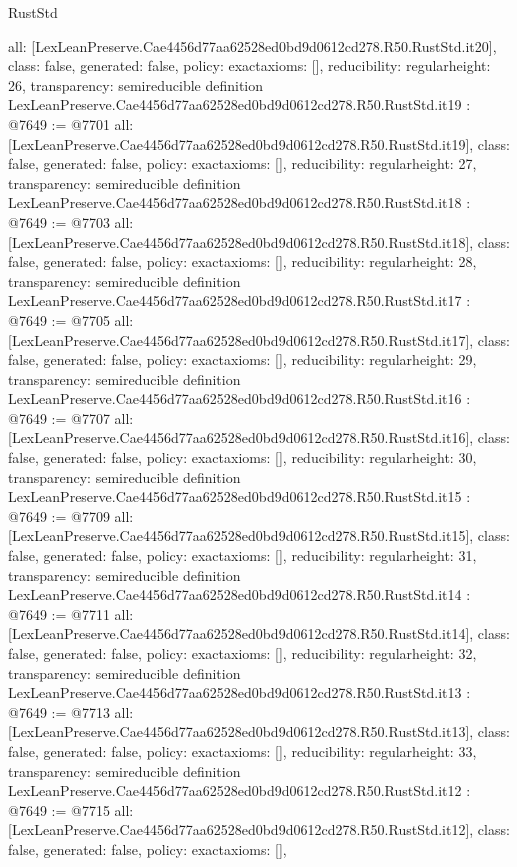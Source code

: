 \begin{lexlean}{RustStd}
\begin{coremodule}
{  all: [LexLeanPreserve.Cae4456d77aa62528ed0bd9d0612cd278.R50.RustStd.it20],
  class: false,
  generated: false,
  policy: exact{axioms: []},
  reducibility: regular{height: 26},
  transparency: semireducible
}
definition LexLeanPreserve.Cae4456d77aa62528ed0bd9d0612cd278.R50.RustStd.it19 : @7649 := @7701 {
  all: [LexLeanPreserve.Cae4456d77aa62528ed0bd9d0612cd278.R50.RustStd.it19],
  class: false,
  generated: false,
  policy: exact{axioms: []},
  reducibility: regular{height: 27},
  transparency: semireducible
}
definition LexLeanPreserve.Cae4456d77aa62528ed0bd9d0612cd278.R50.RustStd.it18 : @7649 := @7703 {
  all: [LexLeanPreserve.Cae4456d77aa62528ed0bd9d0612cd278.R50.RustStd.it18],
  class: false,
  generated: false,
  policy: exact{axioms: []},
  reducibility: regular{height: 28},
  transparency: semireducible
}
definition LexLeanPreserve.Cae4456d77aa62528ed0bd9d0612cd278.R50.RustStd.it17 : @7649 := @7705 {
  all: [LexLeanPreserve.Cae4456d77aa62528ed0bd9d0612cd278.R50.RustStd.it17],
  class: false,
  generated: false,
  policy: exact{axioms: []},
  reducibility: regular{height: 29},
  transparency: semireducible
}
definition LexLeanPreserve.Cae4456d77aa62528ed0bd9d0612cd278.R50.RustStd.it16 : @7649 := @7707 {
  all: [LexLeanPreserve.Cae4456d77aa62528ed0bd9d0612cd278.R50.RustStd.it16],
  class: false,
  generated: false,
  policy: exact{axioms: []},
  reducibility: regular{height: 30},
  transparency: semireducible
}
definition LexLeanPreserve.Cae4456d77aa62528ed0bd9d0612cd278.R50.RustStd.it15 : @7649 := @7709 {
  all: [LexLeanPreserve.Cae4456d77aa62528ed0bd9d0612cd278.R50.RustStd.it15],
  class: false,
  generated: false,
  policy: exact{axioms: []},
  reducibility: regular{height: 31},
  transparency: semireducible
}
definition LexLeanPreserve.Cae4456d77aa62528ed0bd9d0612cd278.R50.RustStd.it14 : @7649 := @7711 {
  all: [LexLeanPreserve.Cae4456d77aa62528ed0bd9d0612cd278.R50.RustStd.it14],
  class: false,
  generated: false,
  policy: exact{axioms: []},
  reducibility: regular{height: 32},
  transparency: semireducible
}
definition LexLeanPreserve.Cae4456d77aa62528ed0bd9d0612cd278.R50.RustStd.it13 : @7649 := @7713 {
  all: [LexLeanPreserve.Cae4456d77aa62528ed0bd9d0612cd278.R50.RustStd.it13],
  class: false,
  generated: false,
  policy: exact{axioms: []},
  reducibility: regular{height: 33},
  transparency: semireducible
}
definition LexLeanPreserve.Cae4456d77aa62528ed0bd9d0612cd278.R50.RustStd.it12 : @7649 := @7715 {
  all: [LexLeanPreserve.Cae4456d77aa62528ed0bd9d0612cd278.R50.RustStd.it12],
  class: false,
  generated: false,
  policy: exact{axioms: []},
}
\end{coremodule}
\end{lexlean}
